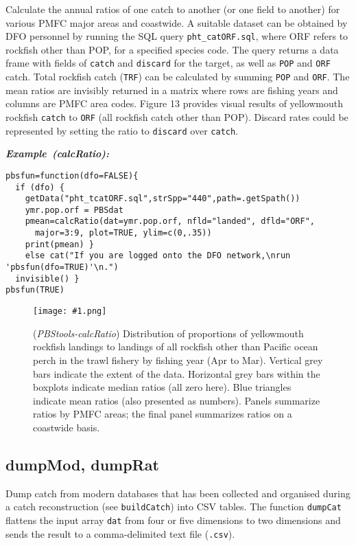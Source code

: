 \documentclass[letterpaper,12pt,fleqn]{article}
\def\tab{\hspace{0.5 in}}
\newcommand{\code}[1]{\small\texttt{#1}\normalsize}
\newcommand\pbsfig[4]{    %
	\begin{figure}[ht!] %
	\centering
	\texttt{[image: \#1.png]}
	\ifthenelse{\isempty{#4}}
		{\caption[#2]{(\emph{#1}) #2}\vspace{-2ex}}
		{\caption[#4]{(\emph{#1}) #2}\vspace{-2ex}}
	\label{fig:#1}
	\end{figure}
}
\newcommand\example[1]{    %
	\textbf{\emph{Example~(#1):}}\\ \vspace{3 pt}
}
\begin{document}
\tab Calculate the annual ratios of one catch to another (or one field to another) for various PMFC major areas and coastwide. A suitable dataset can be obtained by DFO personnel by running the SQL query \code{pht\_catORF.sql}, where ORF refers to rockfish other than POP, for a specified species code. The query returns a data frame with fields of \code{catch} and \code{discard} for the target, as well as \code{POP} and \code{ORF} catch. Total rockfish catch (\code{TRF}) can be calculated by summing \code{POP} and \code{ORF}. The mean ratios are invisibly returned in a matrix where rows are fishing years and columns are PMFC area codes. Figure 13 provides visual results of yellowmouth rockfish \code{catch} to \code{ORF} (all rockfish catch other than POP). Discard rates could be represented by setting the ratio to \code{discard} over \code{catch}.

\begin{examplebox}
\example{calcRatio}
\begin{Verbatim}[fontsize=\footnotesize]
pbsfun=function(dfo=FALSE){
  if (dfo) {
    getData("pht_tcatORF.sql",strSpp="440",path=.getSpath())
    ymr.pop.orf = PBSdat
    pmean=calcRatio(dat=ymr.pop.orf, nfld="landed", dfld="ORF",
      major=3:9, plot=TRUE, ylim=c(0,.35))
    print(pmean) }
    else cat("If you are logged onto the DFO network,\nrun 'pbsfun(dfo=TRUE)'\n.")
  invisible() }
pbsfun(TRUE)
\end{Verbatim}
\end{examplebox}
\pbsfig{PBStools-calcRatio}{Distribution of proportions of yellowmouth rockfish landings to landings of all rockfish other than Pacific ocean perch in the trawl fishery by fishing year (Apr to Mar). Vertical grey bars indicate the extent of the data. Horizontal grey bars within the boxplots indicate median ratios (all zero here). Blue triangles indicate mean ratios (also presented as numbers). Panels summarize ratios by PMFC areas; the final panel summarizes ratios on a coastwide basis.}{4.0}{Proportions of YMR landings to those of ORF}

\subsection {dumpMod, dumpRat}

\tab Dump catch from modern databases that has been collected and organised during a catch reconstruction (see \code{buildCatch}) into CSV tables.
The function \code{dumpCat} flattens the input array \code{dat} from four or five dimensions to two dimensions and sends the result to a comma-delimited text file (\code{.csv}).
\end{document}
